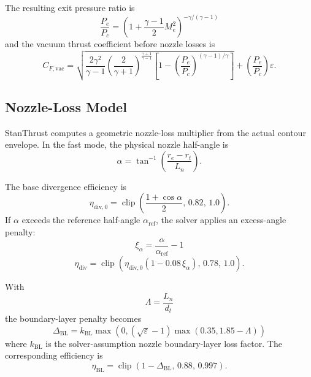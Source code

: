 \documentclass[11pt]{article}
\newcommand{\clip}{\operatorname{clip}}
\begin{document}
The resulting exit pressure ratio is
\begin{equation}
\frac{P_e}{P_c}
=
\left(1+\frac{\gamma-1}{2}M_e^2\right)^{-\gamma/(\gamma-1)}
\label{eq:pressure-ratio}
\end{equation}
and the vacuum thrust coefficient before nozzle losses is
\begin{equation}
C_{F,\text{vac}}
=
\sqrt{
\frac{2\gamma^2}{\gamma-1}
\left(\frac{2}{\gamma+1}\right)^{\frac{\gamma+1}{\gamma-1}}
\left[
1-\left(\frac{P_e}{P_c}\right)^{(\gamma-1)/\gamma}
\right]
}
+
\left(\frac{P_e}{P_c}\right)\varepsilon.
\label{eq:cf-vac}
\end{equation}

\subsection{Nozzle-Loss Model}
StanThrust computes a geometric nozzle-loss multiplier from the actual contour envelope. In the fast mode, the physical nozzle half-angle is
\begin{equation}
\alpha
=
\tan^{-1}\!\left(\frac{r_e-r_t}{L_n}\right).
\label{eq:nozzle-half-angle}
\end{equation}

The base divergence efficiency is
\begin{equation}
\eta_{\text{div},0}=\clip\!\left(\frac{1+\cos\alpha}{2},\,0.82,\,1.0\right).
\label{eq:divergence-eff-base}
\end{equation}
If $\alpha$ exceeds the reference half-angle $\alpha_{\text{ref}}$, the solver applies an excess-angle penalty:
\begin{equation}
\xi_\alpha=\frac{\alpha}{\alpha_{\text{ref}}}-1
\label{eq:excess-angle}
\end{equation}
\begin{equation}
\eta_{\text{div}}
=
\clip\!\left(
\eta_{\text{div},0}(1-0.08\,\xi_\alpha),
\,
0.78,\,
1.0
\right).
\label{eq:divergence-eff}
\end{equation}

With
\begin{equation}
\Lambda=\frac{L_n}{d_t}
\label{eq:length-throat}
\end{equation}
the boundary-layer penalty becomes
\begin{equation}
\Delta_{\text{BL}}
=
k_{\text{BL}}
\max\!\left(0,\left(\sqrt{\varepsilon}-1\right)\max(0.35,1.85-\Lambda)\right)
\label{eq:bl-penalty}
\end{equation}
where $k_{\text{BL}}$ is the solver-assumption nozzle boundary-layer loss factor. The corresponding efficiency is
\begin{equation}
\eta_{\text{BL}}=\clip(1-\Delta_{\text{BL}},\,0.88,\,0.997).
\label{eq:bl-eff}
\end{equation}
\end{document}
